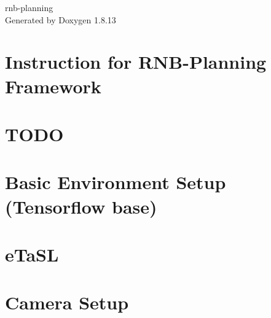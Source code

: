 \documentclass[twoside]{book}
\newcommand{\+}{\discretionary{\mbox{\scriptsize$\hookleftarrow$}}{}{}}
\newcommand{\clearemptydoublepage}{%
  \newpage{\pagestyle{empty}\cleardoublepage}%
}
\begin{document}
\hypersetup{pageanchor=false,
             bookmarksnumbered=true,
             pdfencoding=unicode
            }
\begin{titlepage}
\vspace*{7cm}
\begin{center}%
{\Large rnb-\/planning }\\
\vspace*{1cm}
{\large Generated by Doxygen 1.8.13}\\
\end{center}
\end{titlepage}
\clearemptydoublepage
{}
\tableofcontents
\clearemptydoublepage
{}
\hypersetup{pageanchor=true}

\chapter{Instruction for R\+N\+B-\/\+Planning Framework}
\label{index}\hypertarget{index}{}
\chapter{T\+O\+DO}
\label{md__home_rnb__projects_rnb-planning_docs_dev_log}

\chapter{Basic Environment Setup (Tensorflow base)}
\label{md__home_rnb__projects_rnb-planning_docs__e_n_v_i_r_o_n_m_e_n_t}

\chapter{e\+Ta\+SL}
\label{md__home_rnb__projects_rnb-planning_docs__e_t_a_s_l__s_e_t_u_p}

\chapter{Camera Setup}
\label{md__home_rnb__projects_rnb-planning_docs__h_a_r_d_w_a_r_e__s_e_t_u_p}

\end{document}
